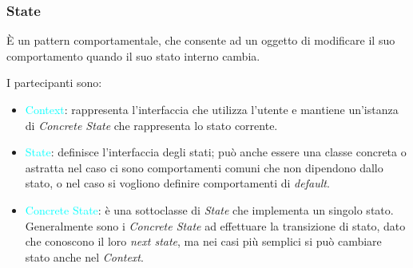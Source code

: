 \subsubsection{State}

È un pattern comportamentale, che consente ad un oggetto di modificare
il suo comportamento quando il suo stato interno cambia.

I partecipanti sono:
\begin{itemize}
    \item \textcolor{cyan}{Context}: rappresenta l'interfaccia che utilizza l'utente e 
        mantiene un'istanza di \emph{Concrete State} che rappresenta lo stato corrente.
    \item \textcolor{cyan}{State}: definisce l'interfaccia degli stati; può anche essere
        una classe concreta o astratta nel caso ci sono comportamenti comuni che non dipendono dallo stato,
        o nel caso si vogliono definire comportamenti di \emph{default}.
    \item \textcolor{cyan}{Concrete State}: è una sottoclasse di \emph{State} che implementa un
        singolo stato. Generalmente sono i \emph{Concrete State} ad effettuare la transizione di stato,
        dato che conoscono il loro \emph{next state}, ma nei casi più semplici si può cambiare stato anche nel
        \emph{Context}.
\end{itemize}